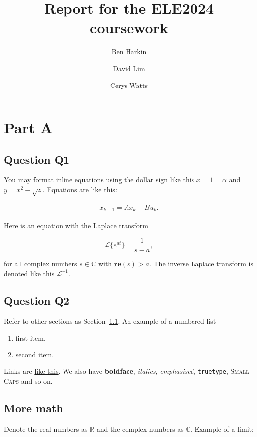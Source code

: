 \documentclass[a4paper,11pt,reqno]{amsart}
\title[ELE2024 Coursework]{Report for the ELE2024 coursework}
\author[B. Harkin]{Ben Harkin}
\author[D. Lim]{David Lim}
\author[C. Watts]{Cerys Watts}
\renewcommand{\Re}{\mathbf{re}}
\newcommand{\R}{\mathbb{R}}
\newcommand{\C}{\mathbb{C}}
\newcommand{\lap}{\mathscr{L}}
\begin{document}
\maketitle


\section{Part A}
    
    \subsection{Question Q1}\label{sec:q1}
        You may format inline equations using the dollar sign like this $x = 1 = \alpha$ and $y = x^2 - \sqrt{z}$. Equations are like this:
        
        \begin{align}\label{eq:lti_state_update}
            x_{k+1} = A x_k + Bu_k.
        \end{align}
        
        Here is an equation with the Laplace transform
        
        \begin{equation}
            \lap \{e^{at}\} = \frac{1}{s-a},
        \end{equation}
        
        for all complex numbers $s\in\C$ with $\Re(s)>a$. The inverse Laplace transform is denoted like this $\lap^{-1}$.
    
    \subsection{Question Q2}
        Refer to other sections as Section~\ref{sec:q1}. An example of a numbered list
        \begin{enumerate}
            \item first item,
            \item second item.
        \end{enumerate}
        Links are \href{https://google.com}{like this}. We also have \textbf{boldface}, \textit{italics},
        \emph{emphasised}, \texttt{truetype}, \textsc{Small Caps} and so on.
    
    \subsection{More math} Denote the real numbers as $\R$ and the complex numbers as $\C$. Example of a limit:
    
\end{document}
